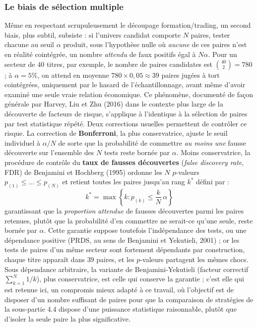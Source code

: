 \documentclass{article}
\begin{document}
\subsubsection*{Le biais de sélection multiple}
Même en respectant scrupuleusement le découpage formation/trading, un second biais, plus subtil, subsiste : si l'univers candidat comporte $N$ paires, tester chacune au seuil $\alpha$ produit, sous l'hypothèse nulle où \emph{aucune} de ces paires n'est en réalité cointégrée, un nombre \emph{attendu} de faux positifs égal à $N\alpha$. Pour un secteur de $40$ titres, par exemple, le nombre de paires candidates est $\binom{40}{2}=780$ ; à $\alpha=5\%$, on attend en moyenne $780\times0{,}05\approx 39$ paires jugées à tort cointégrées, uniquement par le hasard de l'échantillonnage, avant même d'avoir examiné une seule vraie relation économique. Ce phénomène, documenté de façon générale par Harvey, Liu et Zhu (2016) dans le contexte plus large de la découverte de facteurs de risque, s'applique à l'identique à la sélection de paires par test statistique répété.
Deux corrections usuelles permettent de contrôler ce risque. La correction de \textbf{Bonferroni}, la plus conservatrice, ajuste le seuil individuel à $\alpha/N$ de sorte que la probabilité de commettre \emph{au moins une} fausse découverte sur l'ensemble des $N$ tests reste bornée par $\alpha$. Moins conservatrice, la procédure de contrôle du \textbf{taux de fausses découvertes} (\emph{false discovery rate}, FDR) de Benjamini et Hochberg (1995) ordonne les $N$ $p$-valeurs $p_{(1)}\leq\dots\leq p_{(N)}$ et retient toutes les paires jusqu'au rang $k^\ast$ défini par :
\begin{equation}
k^\ast = \max\left\{k : p_{(k)} \leq \frac{k}{N}\,\alpha\right\}
\end{equation}
garantissant que la \emph{proportion attendue} de fausses découvertes parmi les paires retenues, plutôt que la probabilité d'en commettre ne serait-ce qu'une seule, reste bornée par $\alpha$. Cette garantie suppose toutefois l'indépendance des tests, ou une dépendance positive (PRDS, au sens de Benjamini et Yekutieli, 2001) ; or les tests de paires d'un même secteur sont fortement dépendants par construction, chaque titre apparaît dans $39$ paires, et les $p$-valeurs partagent les mêmes chocs. Sous dépendance arbitraire, la variante de Benjamini-Yekutieli (facteur correctif $\sum_{k=1}^N 1/k$), plus conservatrice, est celle qui conserve la garantie ; c'est elle qui est retenue ici, un compromis mieux adapté à ce travail, où l'objectif est de disposer d'un nombre suffisant de paires pour que la comparaison de stratégies de la sous-partie 4.4 dispose d'une puissance statistique raisonnable, plutôt que d'isoler la seule paire la plus significative.
\end{document}

